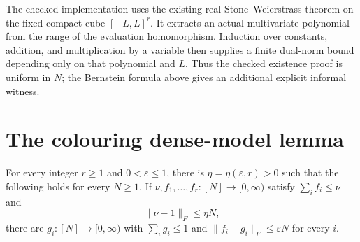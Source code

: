 The checked implementation uses the existing real Stone--Weierstrass theorem
on the fixed compact cube $[-L,L]^r$.  It extracts an actual multivariate
polynomial from the range of the evaluation homomorphism.  Induction over
constants, addition, and multiplication by a variable then supplies a finite
dual-norm bound depending only on that polynomial and $L$.  Thus the checked
existence proof is uniform in $N$; the Bernstein formula above gives an
additional explicit informal witness.


\section{The colouring dense-model lemma}

\begin{theorem}
\label{app:dense-model}
\leanok
{}
For every integer $r\geq1$ and $0<\varepsilon\leq1$, there is
$\eta=\eta(\varepsilon,r)>0$ such that the following holds for every
$N\geq1$.  If $\nu,f_1,\ldots,f_r:[N]\to[0,\infty)$ satisfy
$\sum_if_i\leq\nu$ and
\[
 \|\nu-1\|_F\leq\eta N,
\]
there are $g_i:[N]\to[0,\infty)$ with $\sum_ig_i\leq1$ and
$\|f_i-g_i\|_F\leq\varepsilon N$ for every $i$.
\end{theorem}
